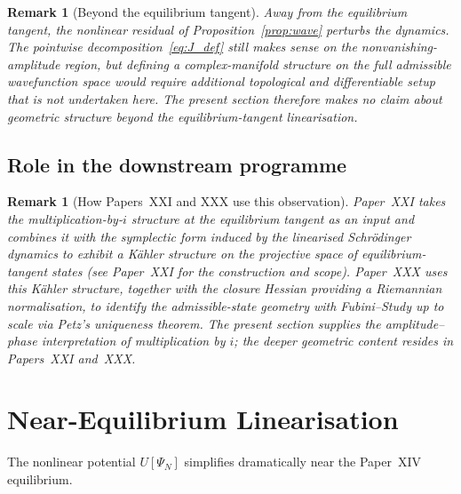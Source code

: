 \documentclass[12pt]{article}
\newtheorem{remark}[theorem]{Remark}
\begin{document}
\begin{remark}[Beyond the equilibrium tangent]\label{rem:J_nonlinear}
Away from the equilibrium tangent, the nonlinear residual of Proposition~\ref{prop:wave} perturbs the dynamics. The pointwise decomposition~\eqref{eq:J_def} still makes sense on the nonvanishing-amplitude region, but defining a complex-manifold structure on the full admissible wavefunction space would require additional topological and differentiable setup that is not undertaken here. The present section therefore makes no claim about geometric structure beyond the equilibrium-tangent linearisation.
\end{remark}

\subsection{Role in the downstream programme}\label{subsec:xviii_role}

\begin{remark}[How Papers~XXI and XXX use this observation]\label{rem:J_downstream}
Paper~XXI takes the multiplication-by-$i$ structure at the equilibrium tangent as an input and combines it with the symplectic form induced by the linearised Schr\"odinger dynamics to exhibit a K\"ahler structure on the projective space of equilibrium-tangent states (see Paper~XXI for the construction and scope). Paper~XXX uses this K\"ahler structure, together with the closure Hessian providing a Riemannian normalisation, to identify the admissible-state geometry with Fubini--Study up to scale via Petz's uniqueness theorem. The present section supplies the amplitude--phase interpretation of multiplication by $i$; the deeper geometric content resides in Papers~XXI and~XXX.
\end{remark}

\section{Near-Equilibrium Linearisation}\label{sec:linear}

The nonlinear potential $U[\Psi_N]$ simplifies dramatically near the Paper~XIV equilibrium.
\end{document}

